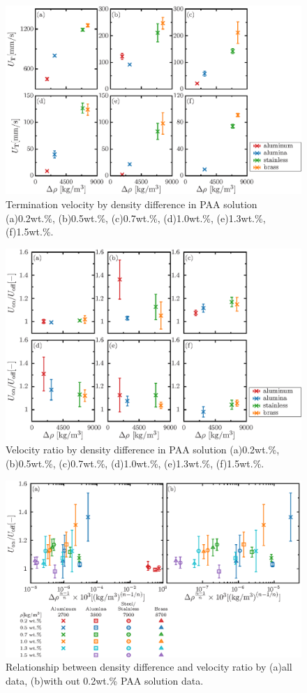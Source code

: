 \begin{figure}[ht]
    \centering
    \includegraphics[width=1.0\textwidth]{./5-Results/rhoUT.eps}
    \caption{Termination velocity by density difference in PAA solution (a)0.2wt.\%, (b)0.5wt.\%, (c)0.7wt.\%, (d)1.0wt.\%, (e)1.3wt.\%, (f)1.5wt.\%.}
    \label{fig:rhoUT}
\end{figure}

\begin{figure}[ht]
    \centering
    \includegraphics[width=1.0\textwidth]{./5-Results/rhoUdiff.eps}
    \caption{Velocity ratio by density difference in PAA solution (a)0.2wt.\%, (b)0.5wt.\%, (c)0.7wt.\%, (d)1.0wt.\%, (e)1.3wt.\%, (f)1.5wt.\%.}
    \label{fig:rhoUdiff}
\end{figure}

\begin{figure}[ht]
    \centering
    \includegraphics[width=1.0\textwidth]{./5-Results/rhoUdiffAll.eps}
    \caption{Relationship between density difference and velocity ratio by (a)all data, (b)with out 0.2wt.\% PAA solution data.}
    \label{fig:rhoUdiffAll}
\end{figure}